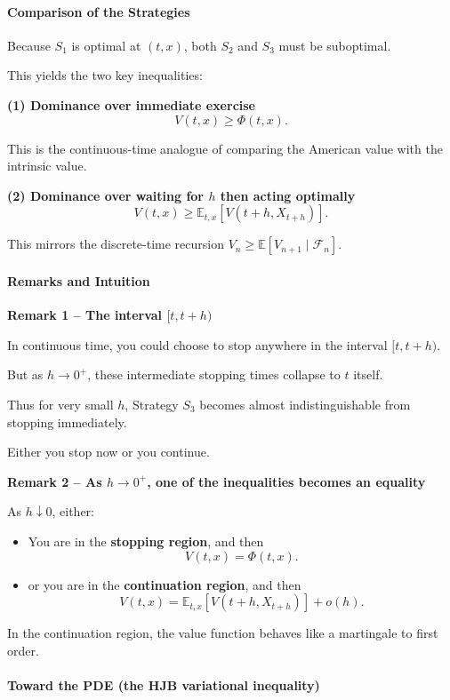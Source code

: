 \documentclass[12pt,a4paper]{article}
\theoremstyle{definition}
\begin{document}
\paragraph{Comparison of the Strategies}

Because $S_1$ is optimal at $(t, x)$, both $S_2$ and $S_3$ must be suboptimal.

This yields the two key inequalities:

\textbf{(1) Dominance over immediate exercise}
\[
V(t, x) \geq \Phi(t, x).
\]

This is the continuous-time analogue of comparing the American value with the intrinsic value.

\textbf{(2) Dominance over waiting for $h$ then acting optimally}
\[
V(t, x) \geq \mathbb{E}_{t,x}[V(t+h, X_{t+h})].
\]

This mirrors the discrete-time recursion $V_n \geq \mathbb{E}[V_{n+1} \mid \mathcal{F}_n]$.

\paragraph{Remarks and Intuition}

\textbf{Remark 1 -- The interval $[t, t+h)$}

In continuous time, you could choose to stop anywhere in the interval $[t, t+h)$.

But as $h \to 0^+$, these intermediate stopping times collapse to $t$ itself.

Thus for very small $h$, Strategy $S_3$ becomes almost indistinguishable from stopping immediately.

Either you stop now or you continue.

\textbf{Remark 2 -- As $h \to 0^+$, one of the inequalities becomes an equality}

As $h \downarrow 0$, either:
\begin{itemize}
\item You are in the \textbf{stopping region}, and then
\[
V(t, x) = \Phi(t, x).
\]

\item or you are in the \textbf{continuation region}, and then
\[
V(t, x) = \mathbb{E}_{t,x}[V(t+h, X_{t+h})] + o(h).
\]
\end{itemize}

In the continuation region, the value function behaves like a martingale to first order.

\paragraph{Toward the PDE (the HJB variational inequality)}
\end{document}
